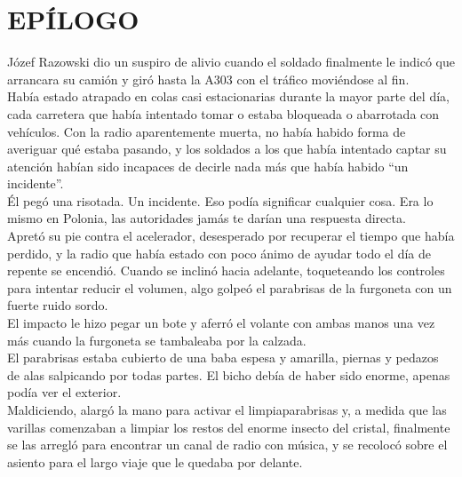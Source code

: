 \chapter*{EPÍLOGO}
Józef Razowski dio un suspiro de alivio cuando el soldado finalmente le
indicó que arrancara su camión y giró hasta la A303 con el tráfico
moviéndose al fin.\\
Había estado atrapado en colas casi estacionarias durante la mayor parte
del día, cada carretera que había intentado tomar o estaba bloqueada o
abarrotada con vehículos. Con la radio aparentemente muerta, no había
habido forma de averiguar qué estaba pasando, y los soldados a los que
había intentado captar su atención habían sido incapaces de decirle nada
más que había habido ``un incidente''.\\
Él pegó una risotada. Un incidente. Eso podía significar cualquier cosa.
Era lo mismo en Polonia, las autoridades jamás te darían una respuesta
directa.\\
Apretó su pie contra el acelerador, desesperado por recuperar el tiempo
que había perdido, y la radio que había estado con poco ánimo de ayudar
todo el día de repente se encendió. Cuando se inclinó hacia adelante,
toqueteando los controles para intentar reducir el volumen, algo golpeó
el parabrisas de la furgoneta con un fuerte ruido sordo.\\
El impacto le hizo pegar un bote y aferró el volante con ambas manos una
vez más cuando la furgoneta se tambaleaba por la calzada.\\
El parabrisas estaba cubierto de una baba espesa y amarilla, piernas y
pedazos de alas salpicando por todas partes. El bicho debía de haber
sido enorme, apenas podía ver el exterior.\\
Maldiciendo, alargó la mano para activar el limpiaparabrisas y, a medida
que las varillas comenzaban a limpiar los restos del enorme insecto del
cristal, finalmente se las arregló para encontrar un canal de radio con
música, y se recolocó sobre el asiento para el largo viaje que le
quedaba por delante.\\

